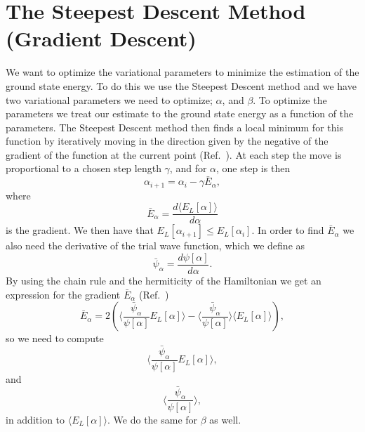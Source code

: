 \documentclass[../main.tex]{subfiles}
\begin{document}
\section{The Steepest Descent Method (Gradient Descent)}\label{sec:SteepestDescent}
We want to optimize the variational parameters to minimize the estimation of the ground state energy. To do this we use the Steepest Descent method and we have two variational parameters we need to optimize; $\alpha$, and $\beta$. To optimize the parameters we treat our estimate to the ground state energy as a function of the parameters. The Steepest Descent method then finds a local minimum for this function by iteratively moving in the direction given by the negative of the gradient of the function at the current point (Ref.~\cite{CG-wiki}). At each step the move is proportional to a chosen step length $\gamma$, and for $\alpha$, one step is then
\begin{equation}\label{eq: SteepestDesc}
    \alpha_{i+1} = \alpha_i - \gamma\bar{E}_\alpha,
\end{equation}
where
\begin{equation}
    \bar{E}_\alpha = \frac{d\langle E_L[\alpha]\rangle}{d\alpha}
\end{equation}
is the gradient. We then have that $E_L[\alpha_{i+1}]\leq E_L[\alpha_i]$. In order to find $\bar{E}_\alpha$ we also need the derivative of the trial wave function, which we define as
\begin{equation}
    \bar{\psi}_\alpha = \frac{d\psi[\alpha]}{d\alpha}.
\end{equation}
By using the chain rule and the hermiticity of the Hamiltonian we get an expression for the gradient $\bar{E}_\alpha$ (Ref.~\cite{FYS4411-CG})
\begin{equation}\label{eq: energygradient}
 \bar{E}_\alpha = 2 \left( \Bigr\langle \frac{\bar{\psi}_\alpha}{\psi[\alpha]} E_L[\alpha] \Bigr\rangle 
 - \Bigr\langle \frac{\bar{\psi}_\alpha}{\psi[\alpha]}\Bigr\rangle \langle E_L[\alpha] \rangle   \right),
\end{equation}
so we need to compute
\begin{equation}\label{eq: psiDerEn}
    \Bigr\langle \frac{\bar{\psi}_\alpha}{\psi[\alpha]} E_L[\alpha] \Bigr\rangle,
\end{equation}
and
\begin{equation}\label{eq: psiDer}
    \Bigr\langle \frac{\bar{\psi}_\alpha}{\psi[\alpha]}\Bigr\rangle,
\end{equation}
in addition to $\langle E_L[\alpha] \rangle$. We do the same for $\beta$ as well.
\end{document}
